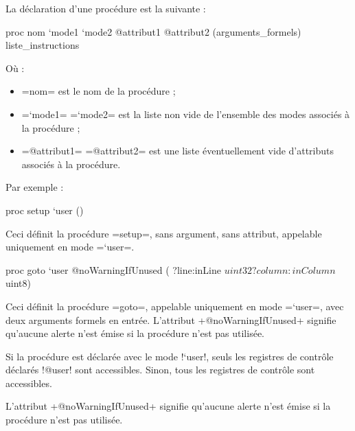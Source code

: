 


La déclaration d'une procédure est la suivante :
\begin{PLM}
proc nom `mode1 `mode2 @attribut1 @attribut2 (arguments_formels) {
  liste_instructions
}
\end{PLM}
Où :
\begin{itemize}
  \item \plm=nom= est le nom de la procédure ;
  \item \plm=`mode1= \plm=`mode2= est la liste non vide de l'ensemble des modes associés à la procédure ;
  \item \plm=@attribut1= \plm=@attribut2= est une liste éventuellement vide d'attributs associés à la procédure.
\end{itemize}

Par exemple :

\begin{PLM}
proc setup `user () {
}
\end{PLM}

Ceci définit la procédure \plm=setup=, sans argument, sans attribut, appelable uniquement en mode \plm=`user=.

\begin{PLM}
proc goto `user @noWarningIfUnused (
  ?line:inLine $uint32
  ?column:inColumn $uint8) {
}
\end{PLM}

Ceci définit la procédure \plm=goto=, appelable uniquement en mode \plm=`user=, avec deux arguments formels en entrée. L'attribut \plm+@noWarningIfUnused+ signifie qu'aucune alerte n'est émise si la procédure n'est pas utilisée.





Si la procédure est déclarée avec le mode \plm!`user!, seuls les registres de contrôle déclarés \plm!@user! sont accessibles. Sinon, tous les registres de contrôle sont accessibles.








L'attribut \plm+@noWarningIfUnused+ signifie qu'aucune alerte n'est émise si la procédure n'est pas utilisée.



